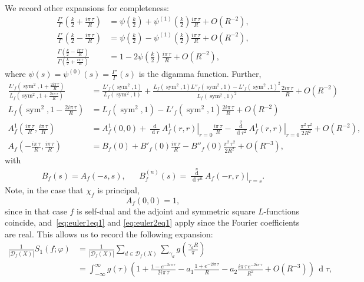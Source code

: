 \documentclass[11pt,reqno]{amsart} \usepackage{fullpage}
\renewcommand{\d}[1]{\,\operatorname*{d}\!{#1}}
\newcommand{\dd}[2][]{\frac{\operatorname*{d}^{#1}}{\operatorname*{d}\! {#2}^{#1}}}
\newcommand\be{\begin{equation}}
\newcommand\ee{\end{equation}}
\DeclareMathOperator{\sym}{sym}
\newcommand{\D}{\mathcal D_f}
\numberwithin{equation}{section}
\begin{document}
We record other expansions for completeness:
\begin{align}
  \frac{\Gamma'}{\Gamma}\left(\frac k2+\frac{i\pi\,\tau}{R}\right)
  &=\psi\left(\tfrac k2\right)+\psi^{(1)}\left(\tfrac k2\right)
  \frac{i\pi\,\tau}{R}+O\left(R^{-2}\right), \\
  \frac{\Gamma'}{\Gamma}\left(\frac k2-\frac{i\pi\,\tau}{R}\right)
  &=\psi\left(\tfrac k2\right)-\psi^{(1)}\left(\tfrac k2\right)
  \frac{i\pi\,\tau}{R}+O\left(R^{-2}\right), \\
  \frac{\Gamma\left(\frac k2-\frac{i\pi\,\tau}{R}\right)}
  {\Gamma\left(\frac k2+\frac{i\pi\,\tau}{R}\right)}
  &=1-2\psi\left(\frac k2\right)\frac{i\pi\,\tau}{R}+O\left(R^{-2}\right),
\end{align}
where $\psi(s)=\psi^{(0)}(s)=\frac{\Gamma'}{\Gamma}(s)$ is the digamma function. Further,
\begin{align}
  \frac{L'_f\left(\sym^2,1+\frac{2i\pi\,\tau}{R}\right)}
  {L_f\left(\sym^2,1+\frac{2i\pi\,\tau}{R}\right)}
  &=
  \frac{L'_f\left(\sym^2,1\right)}{L_f\left(\sym^2,1\right)}
  +
  \frac{L_f\left(\sym^2,1\right)L''_f\left(\sym^2,1\right)
    -L'_f\left(\sym^2,1\right)^2}{L_f\left(\sym^2,1\right)^2}
  \frac{2i\pi\,\tau}{R}
  +O\left(R^{-2}\right) \\
  L_f\left(\sym^2,1-\frac{2i\pi\,\tau}{R}\right)
  &=
  L_f\left(\sym^2,1\right)-L'_f\left(\sym^2,1\right)\frac{2i\pi\,\tau}{R}
  +O\left(R^{-2}\right) \\
  A_f^1\left(\frac{i\pi\,\tau}{R},\frac{i\pi\,\tau}{R}\right)
  &=
  A_f^1(0,0)+\dd{r} \left.A_f^1(r,r)\right|_{r=0}\frac{i\pi\,\tau}{R}
  -\dd[2]{r}\left.A_f^1(r,r)\right|_{r=0}\frac{\pi^2\,\tau^2}{2R^2}
  +O\left(R^{-2}\right), \\
  {A}_f\left(-\frac{i\pi\,\tau}{R},\frac{i\pi\,\tau}{R}\right)
  &=
  {B}_f(0)+ B'_f(0)\frac{i\pi\,\tau}{R}
  - B''_f(0)\frac{\pi^2\,\tau^2}{2R^2}+O\left(R^{-3}\right),
\end{align}
with
\begin{align}
  B_f(s) = A_f(-s,s), &&
  B^{(n)}_f(s)=\dd[n]{r}\left.A_f(-r,r)\right|_{r=s}.
\end{align}
Note, in the case that $\chi_f$ is principal,
\be\label{eq:Aftildezero}
A_f(0,0) = 1, \ee
since in that case $f$ is self-dual and the adjoint and symmetric square
$L$-functions coincide, and~\eqref{eq:euler1eq1} and \eqref{eq:euler2eq1}
apply since the Fourier coefficients are real.
This allows us to record the following expansion:
\be\label{eq:unsimplifiedprincipalexpansion}\begin{aligned}
  \frac1 {\left|\D(X)\right|} S_1(f;\varphi)
  &=
  \frac1 {\left|\D(X)\right|}\sum_{d\in\D(X)}
  \sum_{\gamma_d}g\left(\frac{\gamma_d R}\pi\right) \\
  &=
  \int_{-\infty}^\infty g(\tau)
  \left(
    1 + \frac{1-e^{-2i\pi\,\tau}}{2i\pi\,\tau}
    - a_1\frac{1+e^{-2i\pi\,\tau}}{R}
    - a_2\frac{i\pi\,\tau\,e^{-2i\pi\,\tau}}{R^2}
    + O\left(R^{-3}\right)
  \right)\d\tau,
\end{aligned}\ee
\end{document}
